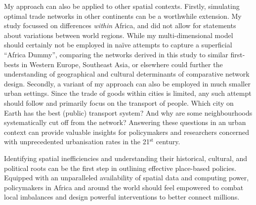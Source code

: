 \documentclass[11pt, oneside]{article}   	%
\begin{document}
My approach can also be applied to other spatial contexts. Firstly, simulating optimal trade networks in other continents can be a worthwhile extension. My study focussed on differences \emph{within} Africa, and did not allow for statements about variations between world regions. While my multi-dimensional model should certainly not be employed in naïve attempts to capture a superficial ``Africa Dummy'', comparing the networks derived in this study to similar first-bests in Western Europe, Southeast Asia, or elsewhere could further the understanding of geographical and cultural determinants of comparative network design. Secondly, a variant of my approach can also be employed in much smaller urban settings. Since the trade of goods within cities is limited, any such attempt should follow \cite{Ahlfeldt_EconomicsDensityEvidence_2015} and primarily focus on the transport of people. Which city on Earth has the best (public) transport system? And why are some neighbourhoods systematically cut off from the network? Answering these questions in an urban context can provide valuable insights for policymakers and researchers concerned with unprecedented urbanisation rates in the 21$^{\textrm{st}}$ century.

Identifying spatial inefficiencies and understanding their historical, cultural, and political roots can be the first step in outlining effective place-based policies. Equipped with an unparalleled availability of spatial data and computing power, policymakers in Africa and around the world should feel empowered to combat local imbalances and design powerful interventions to better connect millions.


\newpage
\begin{spacing}{0.7}

    \setlength{\bibsep}{2.5pt plus 1.5ex}
    

\end{spacing}

\end{document}
